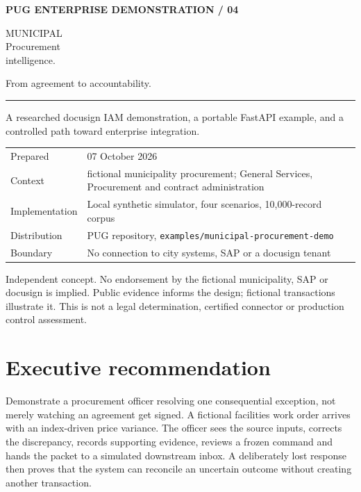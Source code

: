 \documentclass[11pt,letterpaper]{article}
\newcommand{\code}[1]{\texttt{\small #1}}
\begin{document}
\begin{titlepage}
\color{navy}
{\small\bfseries PUG \hfill ENTERPRISE DEMONSTRATION / 04}\par
\vspace{1.15in}
{\fontsize{43}{47}\selectfont MUNICIPAL\\Procurement\\intelligence.}\par
\vspace{0.3in}
{\Large From agreement to accountability.}\par
\vspace{0.3in}
{\color{gold}\rule{0.7\linewidth}{3pt}}\par
\vspace{0.3in}
{\large A researched docusign IAM demonstration, a portable FastAPI example, and a controlled path toward enterprise integration.}\par
\vfill
\begin{tabularx}{\linewidth}{@{}lX@{}}
Prepared & 07 October 2026\\
Context & fictional municipality procurement; General Services, Procurement and contract administration\\
Implementation & Local synthetic simulator, four scenarios, 10,000-record corpus\\
Distribution & PUG repository, \code{examples/municipal-procurement-demo}\\
Boundary & No connection to city systems, SAP or a docusign tenant\\
\end{tabularx}
\vspace{0.3in}
\small Independent concept. No endorsement by the fictional municipality, SAP or docusign is implied. Public evidence informs the design; fictional transactions illustrate it. This is not a legal determination, certified connector or production control assessment.
\end{titlepage}
\tableofcontents\newpage
\section{Executive recommendation}
Demonstrate a procurement officer resolving one consequential exception, not merely watching an agreement get signed. A fictional facilities work order arrives with an index-driven price variance. The officer sees the source inputs, corrects the discrepancy, records supporting evidence, reviews a frozen command and hands the packet to a simulated downstream inbox. A deliberately lost response then proves that the system can reconcile an uncertain outcome without creating another transaction.
\end{document}
